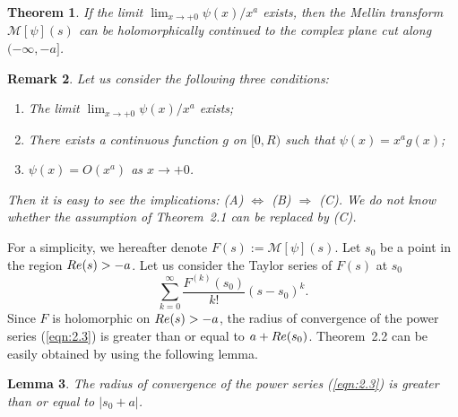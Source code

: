 \documentclass[10pt,a4paper]{amsart}
\numberwithin{equation}{section}
\newtheorem{theorem}{Theorem}[section]
\newtheorem{lemma}[theorem]{Lemma}
\newtheorem{remark}[theorem]{Remark}
\newcommand{\1}{{\bf 1}}
\begin{document}
\begin{theorem}
If the limit $\lim_{x\to+0}\psi(x)/x^a$ exists,  
then the Mellin transform 
${\mathcal M}[\psi](s)$ can be holomorphically 
continued to 
the complex plane cut along 
$(-\infty,-a]$. 
\end{theorem}
\begin{remark}
Let us consider the following three conditions:
\begin{enumerate}
\item[(A)] 
The limit $\lim_{x\to+0}\psi(x)/x^a$ exists; 
\item[(B)] 
There exists a continuous function $g$ on $[0,R)$ such that 
$\psi(x)=x^a g(x)$; 
\item[(C)]
$\psi(x)=O(x^a)$ as $x\to+0$. 
\end{enumerate}
Then it is easy to see the implications: 
(A) $\Longleftrightarrow$
(B) $\Longrightarrow$
(C).
We do not know whether the assumption 
of Theorem~2.1 can be replaced by (C).
\end{remark}

For a simplicity, we hereafter denote 
$F(s):={\mathcal M}[\psi](s)$. 
Let $s_0$ be a point in
the region ${\rm Re}(s)>-a$. 
Let us consider the Taylor series of 
$F(s)$ at $s_0$
\begin{equation}\label{eqn:2.3}
\sum_{k=0}^{\infty}
\frac{F^{(k)}(s_0)}{k!}
(s-s_0)^k.
\end{equation}
Since $F$ is holomorphic on 
${\rm Re}(s)>-a$, 
the radius of convergence of 
the power series (\ref{eqn:2.3}) is greater than 
or equal to $a+{\rm Re}(s_0)$.
Theorem~2.2 can be easily obtained 
by using the following lemma. 

\begin{lemma}\label{lem:2.2}
The radius of convergence of 
the power series (\ref{eqn:2.3}) is greater than 
or equal to $|s_0+a|$.
\end{lemma}
\end{document}
